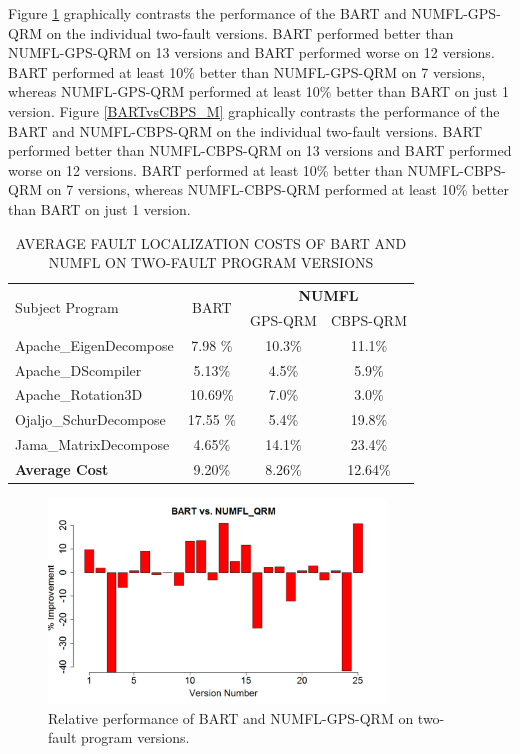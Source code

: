 Figure \ref{BARTvsGPS_M} graphically contrasts the performance of the BART and NUMFL-GPS-QRM on the individual two-fault versions.  BART performed better than NUMFL-GPS-QRM on 13 versions and BART performed worse on 12 versions.  BART performed at least 10\% better than NUMFL-GPS-QRM on 7 versions, whereas NUMFL-GPS-QRM performed at least 10\% better than BART on just 1 version. Figure \ref{BARTvsCBPS_M} graphically contrasts the performance of the BART and NUMFL-CBPS-QRM on the individual two-fault versions.  BART performed better than NUMFL-CBPS-QRM on 13 versions and BART performed worse on 12 versions.  BART performed at least 10\% better than NUMFL-CBPS-QRM on 7 versions, whereas NUMFL-CBPS-QRM performed at least 10\% better than BART on just 1 version.

\begin{table}[htbp!]
\caption{AVERAGE FAULT LOCALIZATION COSTS OF BART AND NUMFL ON TWO-FAULT PROGRAM VERSIONS}
\label{tableBARTvsNUMFL_M}
\centering
      \begin{tabular}{|l|c|c|c|}
      \hline
\multirow{2}{*}{Subject Program}	& \multirow{2}{*}{BART}&	\multicolumn{2}{|c|}{{\bf NUMFL}}	\\	\cline{3-4}
& & GPS-QRM	&CBPS-QRM \\ \hline
Apache\_EigenDecompose	&7.98	\%&10.3\%	&	11.1\%	\\	\hline
Apache\_DScompiler	&	5.13\%&4.5\%	&	5.9\%	\\	\hline
Apache\_Rotation3D	&	10.69\%&7.0\%	&	3.0\%	\\	\hline
Ojaljo\_SchurDecompose	&17.55	\%&5.4\%	&	19.8\%	\\	\hline
Jama\_MatrixDecompose	&	4.65\%&14.1\%	&	23.4\%	\\	\hline
{\bf Average Cost} &9.20\% &8.26\% &12.64\%\\ \hline
\end{tabular}
\end{table}

\begin{figure}[!thpb]
\centering
\includegraphics[width=0.8\textwidth]{chapter4_BARTvsGPS_QRM_M.pdf}
\caption{Relative performance of BART and NUMFL-GPS-QRM on two-fault program versions.}
\label{BARTvsGPS_M}
\end{figure}

